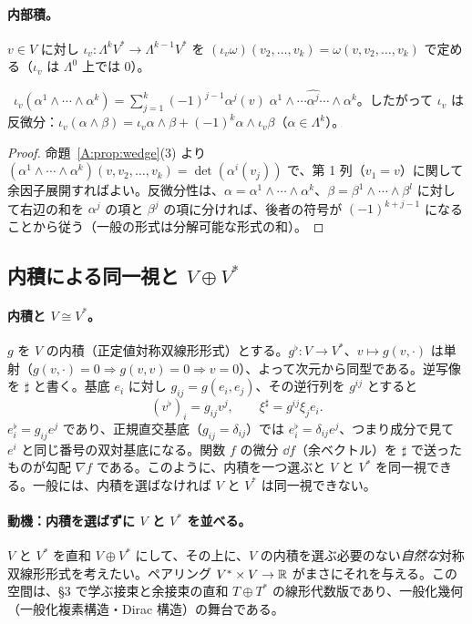\paragraph{内部積。}$v\in V$ に対し $\iota_v:\Lambda^kV^*\to\Lambda^{k-1}V^*$ を $(\iota_v\omega)(v_2,\dots,v_k)=\omega(v,v_2,\dots,v_k)$ で定める（$\iota_v$ は $\Lambda^0$ 上では $0$）。

\begin{lem}\label{A:lem:iota}
\tP\ $\iota_v(\alpha^1\wedge\cdots\wedge\alpha^k)=\sum_{j=1}^k(-1)^{j-1}\alpha^j(v)\;\alpha^1\wedge\cdots\widehat{\alpha^j}\cdots\wedge\alpha^k$。したがって $\iota_v$ は反微分：$\iota_v(\alpha\wedge\beta)=\iota_v\alpha\wedge\beta+(-1)^k\alpha\wedge\iota_v\beta$（$\alpha\in\Lambda^k$）。
\end{lem}
\begin{proof}
命題~\ref{A:prop:wedge}(3) より $(\alpha^1\wedge\cdots\wedge\alpha^k)(v,v_2,\dots,v_k)=\det(\alpha^i(v_j))$ で、第 1 列（$v_1=v$）に関して余因子展開すればよい。反微分性は、$\alpha=\alpha^1\wedge\cdots\wedge\alpha^k$、$\beta=\beta^1\wedge\cdots\wedge\beta^l$ に対して右辺の和を $\alpha^j$ の項と $\beta^j$ の項に分ければ、後者の符号が $(-1)^{k+j-1}$ になることから従う（一般の形式は分解可能な形式の和）。
\end{proof}

\subsection{内積による同一視と $V\oplus V^*$}
\paragraph{内積と $V\cong V^*$。}$g$ を $V$ の内積（正定値対称双線形形式）とする。$g^\flat:V\to V^*$、$v\mapsto g(v,\cdot)$ は単射（$g(v,\cdot)=0\Rightarrow g(v,v)=0\Rightarrow v=0$）、よって次元から同型である。逆写像を $\sharp$ と書く。基底 $e_i$ に対し $g_{ij}=g(e_i,e_j)$、その逆行列を $g^{ij}$ とすると
\[
(v^\flat)_i=g_{ij}v^j,\qquad \xi^\sharp=g^{ij}\xi_je_i .
\]
$e_i^\flat=g_{ij}e^j$ であり、正規直交基底（$g_{ij}=\delta_{ij}$）では $e_i^\flat=\delta_{ij}e^j$、つまり成分で見て $e^i$ と同じ番号の双対基底になる。関数 $f$ の微分 $\dd f$（余ベクトル）を $\sharp$ で送ったものが勾配 $\nabla f$ である。このように、内積を一つ選ぶと $V$ と $V^*$ を同一視できる。一般には、内積を選ばなければ $V$ と $V^*$ は同一視できない。

\paragraph{動機：内積を選ばずに $V$ と $V^*$ を並べる。}$V$ と $V^*$ を直和 $V\oplus V^*$ にして、その上に、$V$ の内積を選ぶ必要のない\emph{自然な}対称双線形形式を考えたい。ペアリング $V^*\times V\to\mathbb R$ がまさにそれを与える。この空間は、§3 で学ぶ接束と余接束の直和 $T\oplus T^*$ の線形代数版であり、一般化幾何（一般化複素構造・Dirac 構造）の舞台である。

